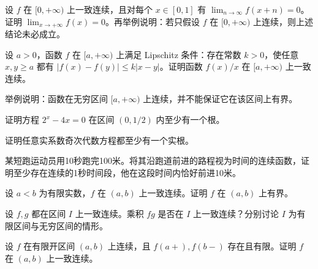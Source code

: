 \newpage
\noindent\begin{minipage}{\textwidth}
设 $f$ 在 $[0,+\infty)$ 上一致连续，且对每个 $x\in[0,1]$ 有 $\lim_{n\to\infty}f(x+n)=0$。证明 $\lim_{x\to+\infty}f(x)=0$。再举例说明：若只假设 $f$ 在 $[0,+\infty)$ 上连续，则上述结论未必成立。
\end{minipage}\par\vfill
\noindent\begin{minipage}{\textwidth}
设 $a>0$，函数 $f$ 在 $[a,+\infty)$ 上满足 Lipschitz 条件：存在常数 $k>0$，使任意 $x,y\ge a$ 都有 $|f(x)-f(y)|\le k|x-y|$。证明函数 $f(x)/x$ 在 $[a,+\infty)$ 上一致连续。
\end{minipage}\par\vfill
\noindent\begin{minipage}{\textwidth}
举例说明：函数在无穷区间 $[a,+\infty)$ 上连续，并不能保证它在该区间上有界。
\end{minipage}\par\vfill
\newpage
\noindent\begin{minipage}{\textwidth}
证明方程 $2^x-4x=0$ 在区间 $(0,1/2)$ 内至少有一个根。
\end{minipage}\par\vfill
\noindent\begin{minipage}{\textwidth}
证明任意实系数奇次代数方程都至少有一个实根。
\end{minipage}\par\vfill
\noindent\begin{minipage}{\textwidth}
某短跑运动员用10秒跑完100米。将其沿跑道前进的路程视为时间的连续函数，证明至少存在连续的1秒时间段，他在这段时间内恰好前进10米。
\end{minipage}\par\vfill
\newpage
\noindent\begin{minipage}{\textwidth}
设 $a<b$ 为有限实数，$f$ 在 $(a,b)$ 上一致连续。证明 $f$ 在 $(a,b)$ 上有界。
\end{minipage}\par\vfill
\noindent\begin{minipage}{\textwidth}
设 $f,g$ 都在区间 $I$ 上一致连续。乘积 $fg$ 是否在 $I$ 上一致连续？分别讨论 $I$ 为有限区间与无穷区间的情形。
\end{minipage}\par\vfill
\noindent\begin{minipage}{\textwidth}
设 $f$ 在有限开区间 $(a,b)$ 上连续，且 $f(a+),f(b-)$ 存在且有限。证明 $f$ 在 $(a,b)$ 上一致连续。
\end{minipage}\par\vfill
